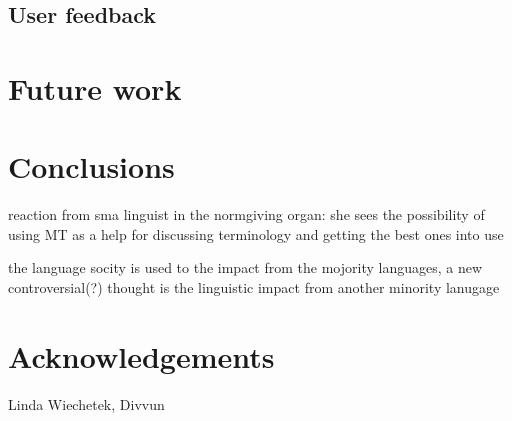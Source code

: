 \documentclass[a4paper,11pt,twocolumn]{article}
\begin{document}
\subsection{User feedback}

\section{Future work}
\section{Conclusions}

 reaction from sma linguist in the normgiving organ: she sees the possibility of using MT as a help for discussing terminology and getting the best ones into use

 the language socity is used to the impact from the mojority languages, a new controversial(?) thought is the linguistic impact from another minority lanugage 


\section*{Acknowledgements}

Linda Wiechetek, Divvun



\end{document}
